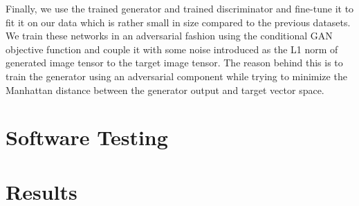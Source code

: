 \documentclass[oneside,a4paper,12pt]{report}
\begin{document}
\hspace*{0.25 in}Finally, we use the trained generator and trained discriminator and fine-tune it to fit it on our data which is rather small in size compared to the previous datasets. We train these networks in an adversarial fashion using the conditional GAN objective function \citep{isola2018imagetoimage} and couple it with some noise introduced as the L1 norm of generated image tensor to the target image tensor. The reason behind this is to train the generator using an adversarial component while trying to minimize the Manhattan distance between the generator output and target vector space.

\chapter{Software Testing}

\chapter{Results}
\end{document}
